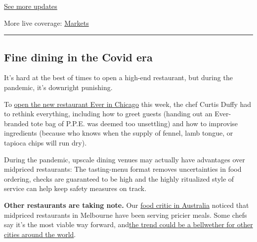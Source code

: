 \href{https://www.nytimes3xbfgragh.onion/2020/08/01/world/coronavirus-covid-19.html?action=click\&pgtype=Article\&state=default\&region=MAIN_CONTENT_1\&context=storylines_live_updates}{See
more updates}

More live coverage:
\href{https://www.nytimes3xbfgragh.onion/live/2020/07/31/business/stock-market-today-coronavirus?action=click\&pgtype=Article\&state=default\&region=MAIN_CONTENT_1\&context=storylines_live_updates}{Markets}

\begin{center}\rule{0.5\linewidth}{\linethickness}\end{center}

\hypertarget{fine-dining-in-the-covid-era}{%
\subsection{Fine dining in the Covid
era}\label{fine-dining-in-the-covid-era}}

It's hard at the best of times to open a high-end restaurant, but during
the pandemic, it's downright punishing.

To
\href{https://www.nytimes3xbfgragh.onion/2020/07/28/dining/ever-chicago-restaurant-coronavirus.html}{open
the new restaurant Ever in Chicago} this week, the chef Curtis Duffy had
to rethink everything, including how to greet guests (handing out an
Ever-branded tote bag of P.P.E. was deemed too unsettling) and how to
improvise ingredients (because who knows when the supply of fennel, lamb
tongue, or tapioca chips will run dry).

During the pandemic, upscale dining venues may actually have advantages
over midpriced restaurants: The tasting-menu format removes
uncertainties in food ordering, checks are guaranteed to be high and the
highly ritualized style of service can help keep safety measures on
track.

\textbf{Other restaurants are taking note.} Our
\href{https://www.nytimes3xbfgragh.onion/column/australia-fare}{food
critic in Australia} noticed that midpriced restaurants in Melbourne
have been serving pricier meals. Some chefs say it's the most viable way
forward,
and\href{https://www.nytimes3xbfgragh.onion/2020/07/28/dining/melbourne-restaurants-coronavirus.html}{the
trend could be a bellwether for other cities around the world}.

\href{https://www.nytimes3xbfgragh.onion/news-event/coronavirus?action=click\&pgtype=Article\&state=default\&region=MAIN_CONTENT_3\&context=storylines_faq}{}

